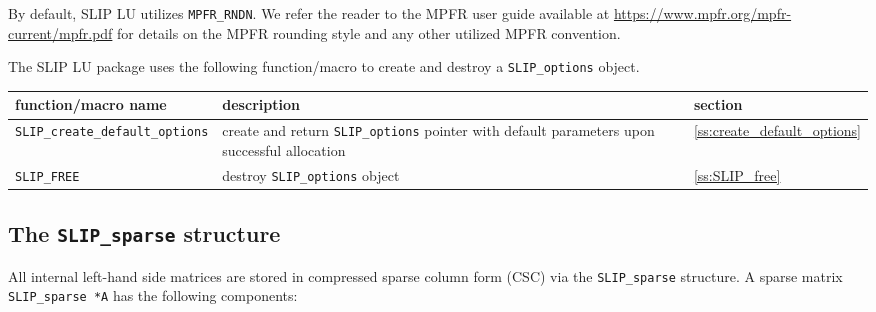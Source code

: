 \documentclass[12pt]{article}
\theoremstyle{definition}
\begin{document}
\begin{itemize}
\noindent By default, SLIP LU utilizes \verb|MPFR_RNDN|. We refer the reader to
the MPFR user guide available at
\url{https://www.mpfr.org/mpfr-current/mpfr.pdf} for details on the MPFR
rounding style and any other utilized MPFR convention.

\end{itemize}

The SLIP LU package uses the following function/macro to create and destroy a
\verb|SLIP_options| object.

\begin{center}
\begin{tabular}{lp{2.5in}l}
\hline
function/macro name & description & section \\
\hline
\verb|SLIP_create_default_options|
    & create and return \verb|SLIP_options| pointer
      with default parameters upon successful allocation
    & \ref{ss:create_default_options} \\
\hline
\verb|SLIP_FREE|
    & destroy \verb|SLIP_options| object
    & \ref{ss:SLIP_free} \\
\hline
\end{tabular}
\end{center}

\cprotect\subsection{The \verb|SLIP_sparse| structure}
\label{ss:SLIP_sparse}

All internal left-hand side matrices are stored in compressed sparse column
form (CSC) via the \verb|SLIP_sparse| structure. A sparse matrix
\verb|SLIP_sparse *A| has the following components:
\end{document}

